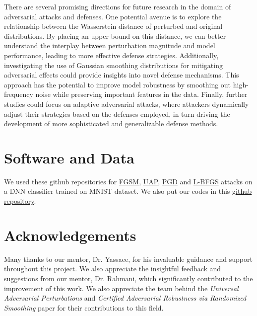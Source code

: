 \documentclass{article}
\theoremstyle{plain}
\theoremstyle{definition}
\theoremstyle{remark}
\begin{document}
There are several promising directions for future research in the domain of adversarial attacks and defenses. One potential avenue is to explore the relationship between the Wasserstein distance of perturbed and original distributions. By placing an upper bound on this distance, we can better understand the interplay between perturbation magnitude and model performance, leading to more effective defense strategies. Additionally, investigating the use of Gaussian smoothing distributions for mitigating adversarial effects could provide insights into novel defense mechanisms. This approach has the potential to improve model robustness by smoothing out high-frequency noise while preserving important features in the data. Finally, further studies could focus on adaptive adversarial attacks, where attackers dynamically adjust their strategies based on the defenses employed, in turn driving the development of more sophisticated and generalizable defense methods.


\section*{Software and Data}
We used these github repositories for 
\href{https://github.com/mkazmier/pytorch-fgsm-simple}{FGSM}, 
\href{https://github.com/LTS4/universal}{UAP},
\href{https://github.com/divijgera/PGD-Attack-on-MNIST}{PGD} and 
\href{https://github.com/cleverhans-lab/cleverhans}{L-BFGS} attacks on a DNN classifier trained on MNIST dataset. We also put our codes in this \href{https://github.com/MohammadParsaTheFirst/High-dimensional-probability-analysis-course}{github repository}.

\section*{Acknowledgements}

Many thanks to our mentor, Dr. Yassaee, for his invaluable guidance and support throughout this project. We also appreciate the insightful feedback and suggestions from our mentor, Dr. Rahmani, which significantly contributed to the improvement of this work. We also appreciate the team behind the \textit{Universal Adversarial Perturbations} and \textit{Certified Adversarial Robustness via Randomized Smoothing} paper for their contributions to this field.
\end{document}
